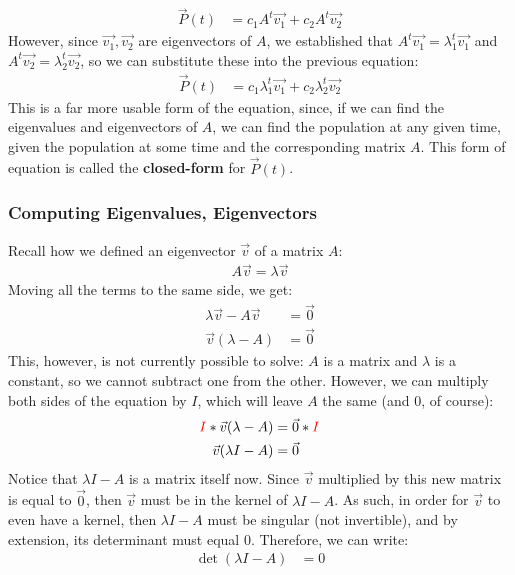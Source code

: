\documentclass[12pt]{article}
\begin{document}
{{\begin{align*}
    \vec{P}(t) &= c_1A^t\vec{v_1} + c_2A^t\vec{v_2}
\end{align*}
However, since $\vec{v_1}, \vec{v_2}$ are eigenvectors of $A$, we established that $A^t\vec{v_1} = \lambda_1^t\vec{v_1}$ and $A^t\vec{v_2} = \lambda_2^t\vec{v_2}$, so we can substitute these into the previous equation:
\begin{align*}
    \vec{P}(t) &= c_1\lambda_1^t\vec{v_1} + c_2\lambda_2^t\vec{v_2}
\end{align*}
This is a far more usable form of the equation, since, if we can find the eigenvalues and eigenvectors of $A$, we can find the population at any given time, given the population at some time and the corresponding matrix $A$. This form of equation is called the \textbf{closed-form} for $\vec{P}(t)$.

\subsubsection{Computing Eigenvalues, Eigenvectors}

Recall how we defined an eigenvector $\vec{v}$ of a matrix $A$:
\begin{align*}
    A\vec{v} = \lambda \vec{v}
\end{align*}
Moving all the terms to the same side, we get:
\begin{align*}
    \lambda \vec{v} - A\vec{v}&= \vec{0}\\
    \vec{v}(\lambda - A) &= \vec{0}
\end{align*}
This, however, is not currently possible to solve: $A$ is a matrix and $\lambda$ is a constant, so we cannot subtract one from the other. However, we can multiply both sides of the equation by $I$, which will leave $A$ the same (and $0$, of course):
\begin{align*}
    \textcolor{red}{I}*\vec{v}(\lambda - A) &= \vec{0}*\textcolor{red}{I}\\
    \vec{v}(\lambda I - A) &= \vec{0}
\end{align*}
Notice that $\lambda I - A$ is a matrix itself now. Since $\vec{v}$ multiplied by this new matrix is equal to $\vec{0}$, then $\vec{v}$ must be in the kernel of $\lambda I - A$. As such, in order for $\vec{v}$ to even have a kernel, then $\lambda I - A$ must be singular (not invertible), and by extension, its determinant must equal $0$. Therefore, we can write:
\begin{align*}
    \det(\lambda I - A) &= 0
\end{align*}

}}
\end{document}
